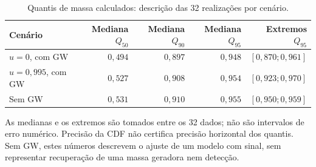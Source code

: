 \begin{table}[htbp]
\centering
\caption{Quantis de massa calculados: descrição das 32 realizações por cenário.}
\label{tab:c07-fixed-quantis}
\begingroup\small\setlength{\tabcolsep}{4pt}
\begin{tabular}{@{}lrrrr@{}}
\toprule
Cenário & Mediana $Q_{50}$ & Mediana $Q_{90}$ & Mediana $Q_{95}$ & Extremos $Q_{95}$ \\
\midrule
$u=0$, com GW & $0{,}494$ & $0{,}897$ & $0{,}948$ & $[0{,}870;0{,}961]$ \\
$u=0{,}995$, com GW & $0{,}527$ & $0{,}908$ & $0{,}954$ & $[0{,}923;0{,}970]$ \\
Sem GW & $0{,}531$ & $0{,}910$ & $0{,}955$ & $[0{,}950;0{,}959]$ \\
\bottomrule
\end{tabular}
\endgroup
\par\smallskip\begin{minipage}{0.96\textwidth}\footnotesize As medianas e os extremos são tomados entre os 32 dados; não são intervalos de erro numérico. Precisão da CDF não certifica precisão horizontal dos quantis. Sem GW, estes números descrevem o ajuste de um modelo com sinal, sem representar recuperação de uma massa geradora nem detecção.\end{minipage}
\end{table}
